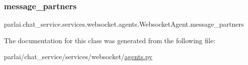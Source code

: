 \subsubsection{\texorpdfstring{message\+\_\+partners}{message\_partners}}
{\footnotesize\ttfamily parlai.\+chat\+\_\+service.\+services.\+websocket.\+agents.\+Websocket\+Agent.\+message\+\_\+partners}



The documentation for this class was generated from the following file\+:\begin{DoxyCompactItemize}
\item 
parlai/chat\+\_\+service/services/websocket/\hyperlink{parlai_2chat__service_2services_2websocket_2agents_8py}{agents.\+py}\end{DoxyCompactItemize}
